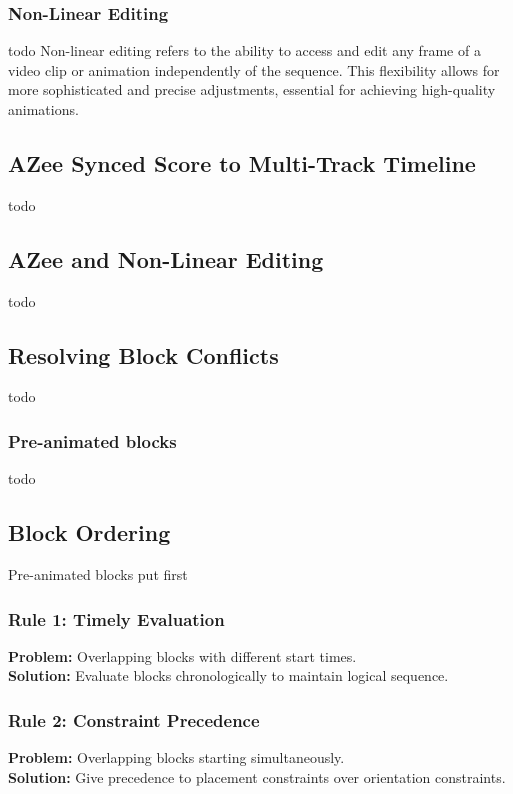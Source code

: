 \documentclass[../../main.tex]{subfiles}
\begin{document}
\subsubsection{Non-Linear Editing}
todo Non-linear editing refers to the ability to access and edit any frame of a video clip or animation independently of the sequence. This flexibility allows for more sophisticated and precise adjustments, essential for achieving high-quality animations.

\subsection{AZee Synced Score to Multi-Track Timeline}

todo

\subsection{AZee and Non-Linear Editing}

todo

\subsection{Resolving Block Conflicts}

todo


\subsubsection{Pre-animated blocks}
todo

\subsection{Block Ordering}

Pre-animated blocks put first

\subsubsection{Rule 1: Timely Evaluation}
\textbf{Problem:} Overlapping blocks with different start times.\\
\textbf{Solution:} Evaluate blocks chronologically to maintain logical sequence.

\subsubsection{Rule 2: Constraint Precedence}
\textbf{Problem:} Overlapping blocks starting simultaneously.\\
\textbf{Solution:} Give precedence to placement constraints over orientation constraints.
\end{document}
